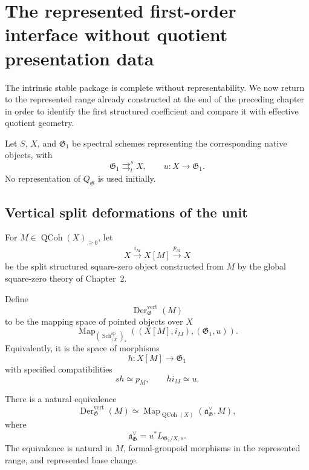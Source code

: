 \section{The represented first-order interface without quotient presentation data}
\label{sec:bnla-represented-first-order}

The intrinsic stable package is complete without representability.  We now
return to the represented range already constructed at the end of the preceding
chapter in order to identify the first structured coefficient and compare it
with effective quotient geometry.

Let $S$, $X$, and $\mathfrak G_1$ be spectral schemes representing the
corresponding native objects, with
\[
    \mathfrak G_1
    \mathop{\rightrightarrows}^{s}_{t}
    X,
    \qquad
    u:X\to\mathfrak G_1.
\]
No representation of $Q_{\mathfrak G}$ is used initially.

\subsection{Vertical split deformations of the unit}

For $M\in\operatorname{QCoh}(X)_{\geq0}$, let
\[
    X\xrightarrow{i_M}X[M]\xrightarrow{p_M}X
\]
be the split structured square-zero object constructed from $M$ by the global
square-zero theory of Chapter~2.

\begin{definition}
\label{def:bnla-relation-vertical-deformations}
Define
\[
    \operatorname{Der}^{\mathrm{vert}}_{\mathfrak G}(M)
\]
to be the mapping space of pointed objects over $X$
\[
    \operatorname{Map}_{(\operatorname{Sch}^{\mathrm{sp}}_{/X})_*}
    \left(
        (X[M],i_M),
        (\mathfrak G_1,u)
    \right).
\]
Equivalently, it is the space of morphisms
\[
    h:X[M]\to\mathfrak G_1
\]
with specified compatibilities
\[
    sh\simeq p_M,
    \qquad
    hi_M\simeq u.
\]
\end{definition}

\begin{theorem}
\label{thm:bnla-source-coefficient-corepresents}
There is a natural equivalence
\[
    \boxed{
    \operatorname{Der}^{\mathrm{vert}}_{\mathfrak G}(M)
    \simeq
    \operatorname{Map}_{\operatorname{QCoh}(X)}
    \left(
        \mathfrak a^\vee_{\mathfrak G},M
    \right),}
\]
where
\[
    \mathfrak a^\vee_{\mathfrak G}
    =
    u^*L_{\mathfrak G_1/X,s}.
\]
The equivalence is natural in $M$, formal-groupoid morphisms in the represented
range, and represented base change.
\end{theorem}

